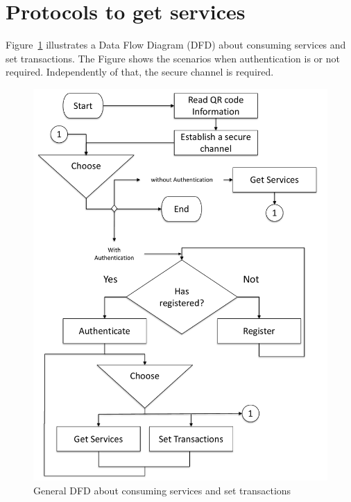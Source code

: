 \section{Protocols to get services}
\label{sec:getServices}
Figure~\ref{fig:dfdForAuthServices} illustrates a Data Flow Diagram (DFD) about consuming  
services and set transactions. The Figure shows the scenarios when authentication is or 
not required. Independently of that, the secure channel is required.

\begin{figure}[bt]
  \centering
    \includegraphics[scale=0.4]{images/dfd.pdf}
        \caption{General DFD about consuming services and set transactions}
    \label{fig:dfdForAuthServices}
\end{figure}

